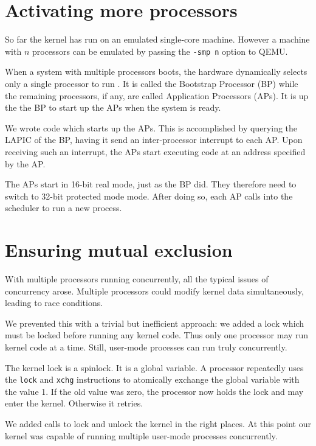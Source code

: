 \documentclass{report}
\begin{document}
\section{Activating more processors}
\label{sec:moreprocs}
So far the kernel has run on an emulated single-core machine. However a
machine with $n$ processors can be emulated by passing the \texttt{-smp n}
option to QEMU.

When a system with multiple processors boots, the hardware dynamically selects
only a single processor to run \cite[section~8.4]{intel3a}. It is called the
Bootstrap Processor (BP) while the remaining processors, if any, are called
Application Processors (APs). It is up the the BP to start up the APs when the
system is ready.

We wrote code which starts up the APs. This is accomplished by querying the
LAPIC of the BP, having it send an inter-processor interrupt to each AP. Upon
receiving such an interrupt, the APs start executing code at an address
specified by the AP.

The APs start in 16-bit real mode, just as the BP did. They therefore need to
switch to 32-bit protected mode mode. After doing so, each AP calls into the
scheduler to run a new process.



\section{Ensuring mutual exclusion}
With multiple processors running concurrently, all the typical issues of
concurrency arose. Multiple processors could modify kernel data
simultaneously, leading to race conditions.

We prevented this with a trivial but inefficient approach: we added a lock
which must be locked before running any kernel code. Thus only one processor
may run kernel code at a time. Still, user-mode processes can run truly
concurrently.

The kernel lock is a spinlock. It is a global variable. A processor repeatedly
uses the \texttt{lock} and \texttt{xchg} instructions to atomically exchange
the global variable with the value 1. If the old value was zero, the processor
now holds the lock and may enter the kernel. Otherwise it retries.

We added calls to lock and unlock the kernel in the right places. At this
point our kernel was capable of running multiple user-mode processes
concurrently.
\end{document}
